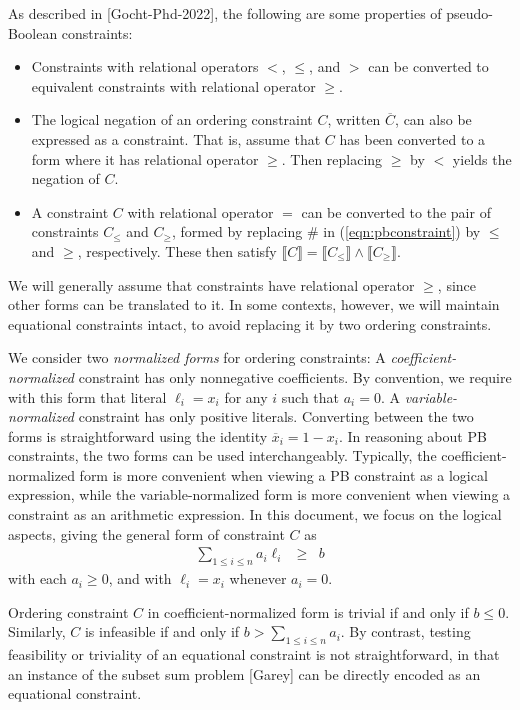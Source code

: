 \documentclass{easychair}
\renewcommand{\obar}[1]{\overline{#1}}
\newcommand{\lit}{\ell}
\newcommand{\func}[1]{\llbracket#1\rrbracket}
\begin{document}
As described in [Gocht-Phd-2022], the following are some properties of pseudo-Boolean constraints:
\begin{itemize}
\item Constraints with relational operators $<$, $\leq$, and $>$ can be
  converted to equivalent constraints with relational operator $\geq$.
\item
The logical negation of an ordering constraint $C$, written $\obar{C}$,
can also be expressed as a constraint.  That is, assume that $C$
has been converted to a form where it has relational operator $\geq$.
Then replacing $\geq$ by $<$ yields the negation of $C$.  
\item
A constraint $C$ with relational operator $=$ can be converted to the
pair of constraints $C_{\leq}$ and $C_{\geq}$, formed by replacing
$\#$ in (\ref{eqn:pbconstraint}) by $\leq$ and $\geq$, respectively.
These then satisfy $\func{C} = \func{C_{\leq}} \land \func{C_{\geq}}$.
\end{itemize}
We will generally
assume that constraints have relational operator $\geq$, since other
forms can be translated to it.  In some contexts, however, we will
maintain equational constraints 
intact, to avoid replacing it by two ordering constraints.


We consider two {\em normalized forms} for ordering constraints: A
{\em coefficient-normalized} constraint has only nonnegative
coefficients.  By convention, we require with this form that literal $\lit_i = x_i$ for any $i$ such that $a_i = 0$.
A {\em variable-normalized} constraint has only
positive literals.  Converting between the two forms is
straightforward using the identity $\obar{x}_i = 1-x_i$.  In reasoning
about PB constraints, the two forms can be used interchangeably.
Typically, the coefficient-normalized form is more convenient when
viewing a PB constraint as a logical expression, while the
variable-normalized form is more convenient when viewing a constraint
as an arithmetic expression.  In this document, we focus on the logical
aspects, giving the general form of constraint $C$ as
\begin{eqnarray}
\sum_{1 \leq i \leq n} a_{i} \lit_{i} & \geq & b \label{eqn:coeff-normalized}
\end{eqnarray}
with each $a_{i} \geq 0$, and with $\lit_{i} = x_i$ whenever $a_i = 0$.

Ordering constraint $C$ in coefficient-normalized form is trivial if and only
if $b \leq 0$.  Similarly, $C$ is infeasible if and only if
$b > \sum_{1 \leq i \leq n} {a_{i}}$.  By contrast, testing feasibility or triviality
of an equational constraint is not straightforward, in that an instance of the
subset sum problem [Garey] can be directly encoded as an equational
constraint.
\end{document}
